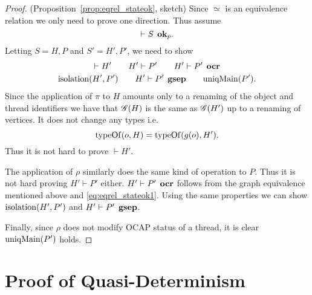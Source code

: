 \begin{proof}{(Proposition~\ref{prop:eqrel_stateok}, sketch)}
  Since $\simeq$ is an equivalence relation we only need to prove one direction.
  Thus assume
  \begin{equation}
    \vdash S \:\: \mbox{{\bf ok}$_p$}.
  \end{equation}
  Letting $S = H, P$ and $S' = H', P'$, we need to show
  \begin{equation} 
    \begin{gathered}
      \vdash H' \quad\quad H' \vdash P' \quad\quad H' \vdash P' \:\: \mbox{\bf ocr} \\
      \mbox{$\mathrm{isolation}$}(H', P') \quad\quad H' \vdash P' \:\: \mbox{\bf gsep} \quad\quad \mbox{$\mathrm{uniqMain}$}(P').
    \end{gathered}
  \end{equation}
  Since the application of $\pi$ to $H$ amounts only to a renaming of the object
  and thread identifiers we have that $\mathscr{G}(H)$ is the same as $\mathscr{G}(H')$ up to a
  renaming of vertices. It does not change any types i.e. 
  \begin{equation} \label{eq:eqrel_stateok1}
    \mbox{$\mathrm{typeOf}$}(o, H) = \mbox{$\mathrm{typeOf}$}(g(o), H').
  \end{equation}
  Thus it is not hard to prove $\vdash H'$. 
  
  The application of $\rho$ similarly does the same kind of operation to $P$.
  Thus it is not hard proving $H' \vdash P'$ either.
  $H' \vdash P' \:\: \mbox{\bf ocr}$ follows from the graph equivalence mentioned above
  and \eqref{eq:eqrel_stateok1}. Using the same properties we can show
  $\mbox{$\mathrm{isolation}$}(H', P')$ and $H' \vdash P' \:\: \mbox{\bf gsep}$.

  Finally, since $\rho$ does not modify OCAP status of a thread, it is clear
  $\mbox{$\mathrm{uniqMain}$}(P')$ holds.
\end{proof}

\newpage
\section{Proof of Quasi-Determinism}
\label{sec:proof_of_quasi_determinism}

